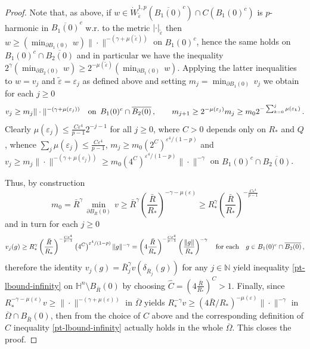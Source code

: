 \documentclass[10pt]{amsart}
\numberwithin{equation}{section}
\theoremstyle{definition}
\newcommand{\He}{\mathbb{H}}
\begin{document}
\begin{proof}
Note that, as above, if  $w \in \dot{W}^{1,p}_{\tilde{\varepsilon}} (\overline{B_1(0)}^c) \cap C(B_1(0)^c)$ is $p$-harmonic in $\overline{B_1(0)}^c$ w.r. to the metric $|\cdot|_{\tilde{\varepsilon}}$ then $w \geq \left( \min_{\partial B_1(0)} \, w\right)  \| \cdot \|^{-(\gamma+\mu(\tilde{\varepsilon}))}$ on $B_1(0)^c$, hence the same holds on $B_1(0)^c \cap \overline{B_2(0)}$ and in particular we have the inequality $2^\gamma \left( \min_{\partial B_2(0)} \, w \right) \geq  2^{-\mu(\tilde{\varepsilon})} \left( \min_{\partial B_1(0)} \, w\right)$.  
Applying the latter inequalities to $w= v_j$ and $\tilde{\varepsilon}=\varepsilon_j$ as defined above  and setting $m_j= \min_{\partial B_1(0)} \,  v_j$ we obtain for each $j \geq 0$
\begin{equation}
\label{induction-minima}
v_j\geq m_j  \| \cdot \|^{-(\gamma+\mu(\varepsilon_j))}  \quad \hbox{on} \, \, \, B_1(0)^c \cap \overline{B_2(0)} \, , \qquad 
m_{j+1} \geq  2^{-\mu(\varepsilon_j)} m_j \geq m_0 2^{-\sum_{k=0}^j \mu(\varepsilon_k)}\, .
\end{equation} 
Clearly $\mu(\varepsilon_j) \leq \frac{C \varepsilon^4}{p-1} 2^{-j-1}$ for all $j \geq 0$, where $C>0$ depends only on $R_\ast$ and $Q$, whence $\sum_j \mu(\varepsilon_j) \leq \frac{C\varepsilon^4}{p-1}$, $m_j \geq m_0 \left(2^C \right)^{\varepsilon^4/(1-p)}$ and $v_j\geq m_j  \| \cdot \|^{-(\gamma+\mu(\varepsilon_j))}\geq m_0 \left(4^C \right)^{\varepsilon^4/(1-p)}  
\| \cdot \|^{-\gamma}$ on  $B_1(0)^c \cap \overline{B_2(0)}$. 

Thus, by construction 
\[ m_0=\bar{R}^\gamma \, \min_{\partial B_{\bar{R}}(0)} \, v \geq \bar{R}^\gamma  \left( \frac{\bar{R}}{R_\ast}\right)^{-\gamma-\mu(\varepsilon)} \geq  R_\ast^\gamma  \left( \frac{\bar{R}}{R_\ast}\right)^{- \frac{C\varepsilon^4}{p-1}} \]
and in turn for each $j\geq 0$
\[  v_j (g)\geq  R_\ast^\gamma  \left( \frac{\bar{R}}{R_\ast}\right)^{- \frac{C\varepsilon^4}{p-1}}  \left(4^C \right)^{\varepsilon^4/(1-p)}  
\| g \|^{-\gamma}=    \left( 4\frac{\bar{R}}{R_\ast}\right)^{- \frac{C\varepsilon^4}{p-1}}   
 \left( \frac{\| g\|}{R_\ast} \right)^{-\gamma} \quad \hbox{for each} \quad g \in B_1(0)^c \cap \overline{B_2(0)}\, ,\]
therefore  the identity $v_j(g)=\bar{R}^\gamma_j v (\delta_{\bar{R}_j}(g))$ for any $j \in \mathbb{N}$ yield inequality \eqref{pt-lbound-infinity} on $\He^n \setminus B_{\bar{R}}(0)$ by choosing $\widehat{C}= \left( 4\frac{\bar{R}}{R_\ast}\right)^C>1$. Finally, since $R_\ast^{-\gamma-\mu(\varepsilon)} v \geq \| \cdot \|^{-(\gamma+\mu(\varepsilon))}$ in $\overline{\Omega}$ yields $R_\ast^{-\gamma} v \geq  (4 \bar{R}/R_\ast)^{-\mu(\varepsilon)} \| \cdot \|^{-\gamma}$ in $\overline{\Omega} \cap B_{\bar{R}}(0)$, then from the choice of $C$ above and the corresponding definition of $\widehat{C}$ inequality \eqref{pt-lbound-infinity} actually holds in the whole $\overline{\Omega}$. This closes the proof.
\end{proof}
\end{document}
